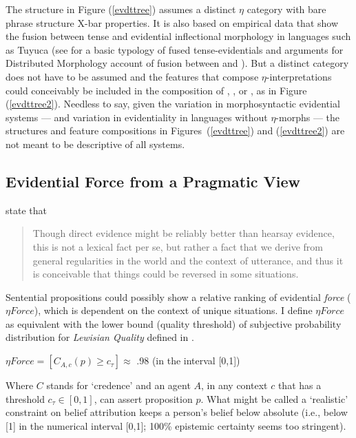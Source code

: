 \documentclass{article}
\begin{document}
The structure in Figure (\ref{evdttree}) assumes a distinct $\eta$ category with bare phrase structure X-bar properties. It is also based on empirical data that show the fusion between tense and evidential inflectional morphology in languages such as Tuyuca (see \cite{bowles08fusedte} for a basic typology of fused tense-evidentials and arguments for Distributed Morphology account of fusion between  and \obar{$\eta$}). But a distinct category does not have to be assumed and the features that compose $\eta$-interpretations could conceivably be included in the composition of , , or , as in Figure (\ref{evdttree2}). Needless to say, given the variation in morphosyntactic evidential systems --- and variation in evidentiality in languages without $\eta$-morphs --- the structures and feature compositions in Figures~(\ref{evdttree}) and (\ref{evdttree2}) are not meant to be descriptive of all systems.  

\subsection{Evidential Force from a Pragmatic View}
 state that

\begin{quote}
Though direct evidence might be reliably better than hearsay evidence, this is not a lexical fact per se, but rather a fact that we derive from general regularities in the world and the context of utterance, and thus it is conceivable that things could be reversed in some situations.
\end{quote}

Sentential propositions could possibly show a relative ranking of evidential {\sl force} ($\eta Force$), which is dependent on the context of unique situations. I define $\eta Force$ as equivalent with the lower bound (quality threshold) of subjective probability distribution for {\sl Lewisian Quality} defined in .

\begin{exe}
\ex $\eta Force = [C_{A,c}(p) \geq c_{\tau}] \approx$ .98 (in the interval [0,1])
\end{exe}

Where $C$ stands for `credence' and an agent $A$, in any context $c$ that has a threshold $c_{\tau} \in [0,1]$, can assert proposition $p$. What might be called a `realistic' constraint on belief attribution keeps a person's belief below absolute (i.e., below [1] in the numerical interval [0,1]; 100\% epistemic certainty seems too stringent).
\end{document}
